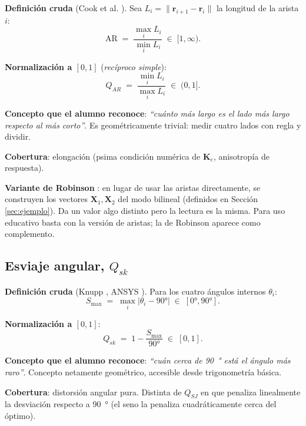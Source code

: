 \documentclass[11pt,a4paper]{article}
\begin{document}
\textbf{Definici\'on cruda} (Cook et al. \cite{Cook2002}). Sea $L_i = \lVert\bm{r}_{i+1}-\bm{r}_i\rVert$
la longitud de la arista $i$:
\[
  \mathrm{AR} \;=\; \frac{\max_i L_i}{\min_i L_i} \;\in\;[1,\infty).
\]

\textbf{Normalizaci\'on a $[0,1]$} (\textit{rec\'iproco simple}):
\begin{equation}\boxed{\;
  Q_{AR} \;=\; \frac{\min_i L_i}{\max_i L_i} \;\in\;(0,1].
\;}\label{eq:QAR}\end{equation}

\textbf{Concepto que el alumno reconoce}: \emph{\textquotedblleft cu\'anto m\'as largo es el lado
m\'as largo respecto al m\'as corto\textquotedblright}. Es geom\'etricamente trivial: medir cuatro
lados con regla y dividir.

\textbf{Cobertura}: elongaci\'on (psima condici\'on num\'erica de $\bm{K}_e$, anisotrop\'ia de
respuesta).

\medskip

\textbf{Variante de Robinson} \cite{Robinson1987}: en lugar de usar las aristas directamente, se
construyen los vectores $\bm{X}_1,\bm{X}_2$ del modo bilineal (definidos en
Secci\'on \ref{sec:ejemplo}). Da un valor algo distinto pero la lectura es la misma. Para uso
educativo basta con la versi\'on de aristas; la de Robinson aparece como complemento.

\subsection{Esviaje angular, $Q_{sk}$}

\textbf{Definici\'on cruda} (Knupp \cite{Knupp2001}, ANSYS \cite{ANSYS2021}). Para los cuatro
\'angulos internos $\theta_i$:
\[
  S_{\max} \;=\; \max_i \bigl|\theta_i - 90\si{\degree}\bigr| \;\in\;[0\si{\degree},90\si{\degree}].
\]

\textbf{Normalizaci\'on a $[0,1]$}:
\begin{equation}\boxed{\;
  Q_{sk} \;=\; 1 - \frac{S_{\max}}{90\si{\degree}} \;\in\;[0,1].
\;}\label{eq:Qsk}\end{equation}

\textbf{Concepto que el alumno reconoce}: \emph{\textquotedblleft cu\'an cerca de \SI{90}{\degree}
est\'a el \'angulo m\'as raro\textquotedblright}. Concepto netamente geom\'etrico, accesible desde
trigonometr\'ia b\'asica.

\textbf{Cobertura}: distorsi\'on angular pura. Distinta de $Q_{SJ}$ en que penaliza linealmente la
desviaci\'on respecto a \SI{90}{\degree} (el seno la penaliza cuadr\'aticamente cerca del
\'optimo).
\end{document}
